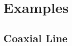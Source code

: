 %
%
%
%
%

\chapter{Examples}
\label{cha:examples}

\section{Coaxial Line}
\label{sec:coaxial-line}

